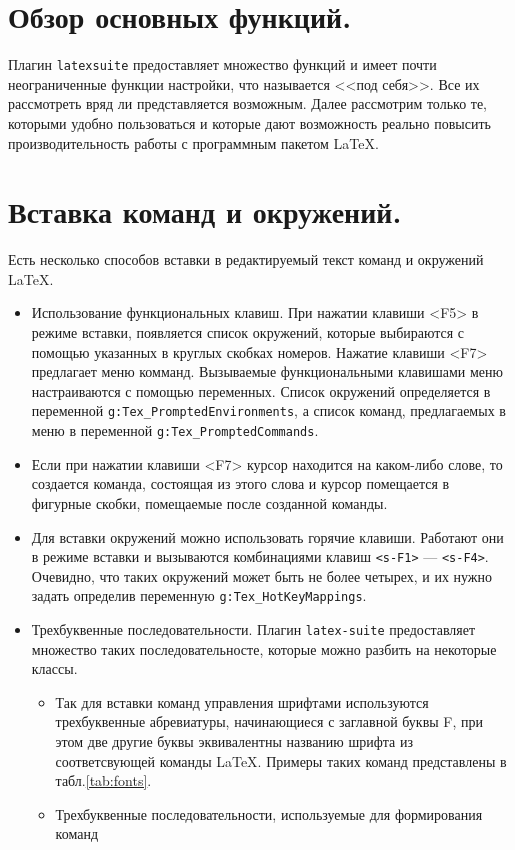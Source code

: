 \documentclass[a4paper]{article}
\begin{document}
\part{Обзор основных функций.}
Плагин \texttt{latexsuite} предоставляет множество функций и имеет почти
неограниченные функции настройки, что называется <<под себя>>. Все их
рассмотреть вряд ли представляется возможным. Далее рассмотрим только те,
которыми удобно пользоваться и которые дают возможность реально 
повысить производительность работы с программным пакетом \LaTeX.
\part{Вставка команд и окружений.}
Есть несколько способов вставки в редактируемый текст команд и окружений \LaTeX.
\begin{itemize}
	\item\sloppy Использование функциональных клавиш. При нажатии клавиши <F5> в режиме
		вставки, появляется список окружений, которые выбираются с помощью 
		указанных в круглых скобках номеров. Нажатие клавиши <F7> предлагает 
		меню комманд. Вызываемые функциональными клавишами меню настраиваются с
		помощью переменных. Список окружений определяется в переменной \verb|g:Tex_PromptedEnvironments|,
		а список команд, предлагаемых в меню в переменной 
		\verb|g:Tex_PromptedCommands|.
	\item Если при нажатии клавиши <F7> курсор находится на каком-либо слове, 
		то создается команда, состоящая из этого слова и курсор помещается в
		фигурные скобки, помещаемые после созданной команды. 
	\item Для вставки окружений можно использовать горячие клавиши. Работают они 
		в режиме вставки и вызываются комбинациями клавиш \texttt{<s-F1>} --- \texttt{<s-F4>}.
		Очевидно, что таких окружений может быть не более четырех, и их нужно 
		задать определив переменную \verb|g:Tex_HotKeyMappings|.
	\item Трехбуквенные последовательности. Плагин \texttt{latex-suite} предоставляет
		множество таких последовательносте, которые можно разбить на некоторые классы.
		\begin{itemize}
			\item 
		Так для вставки команд управления шрифтами 
		используются трехбуквенные абревиатуры, начинающиеся с заглавной буквы F, при
		этом две другие буквы эквивалентны названию шрифта из соответсвующей команды 
		\LaTeX. Примеры таких команд представлены в табл.\ref{tab:fonts}.
			\item Трехбуквенные последовательности, используемые для формирования команд

\end{itemize}
\end{itemize}
\end{document}
